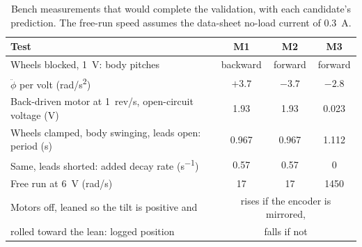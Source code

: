 \begin{table}[htbp]
\centering
\caption{Bench measurements that would complete the validation, with each
candidate's prediction. The free-run speed assumes the data-sheet no-load
current of \SI{0.3}{A}.}
\label{tab:benchtests}
\small
\begin{tabular}{lccc}
\toprule
Test & M1 & M2 & M3 \\
\midrule
Wheels blocked, \SI{+1}{V}: body pitches & backward & forward & forward \\
\quad $\ddot\phi$ per volt (\si{rad/s^2}) & $+3.7$ & $-3.7$ & $-2.8$ \\
Back-driven motor at \SI{1}{rev/s}, open-circuit voltage (\si{V}) & 1.93 & 1.93 & 0.023 \\
Wheels clamped, body swinging, leads open: period (\si{s}) & 0.967 & 0.967 & 1.112 \\
Same, leads shorted: added decay rate (\si{s^{-1}}) & 0.57 & 0.57 & 0 \\
Free run at \SI{6}{V} (\si{rad/s}) & 17 & 17 & 1450 \\
Motors off, leaned so the tilt is positive and & \multicolumn{3}{c}{rises if the encoder is mirrored,} \\
\quad rolled toward the lean: logged position & \multicolumn{3}{c}{falls if not} \\
\bottomrule
\end{tabular}
\end{table}
